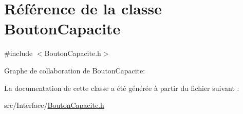 \hypertarget{class_bouton_capacite}{}\section{Référence de la classe Bouton\+Capacite}
\label{class_bouton_capacite}


{\ttfamily \#include $<$Bouton\+Capacite.\+h$>$}



Graphe de collaboration de Bouton\+Capacite\+:


La documentation de cette classe a été générée à partir du fichier suivant \+:\begin{DoxyCompactItemize}
\item 
src/\+Interface/\hyperlink{_bouton_capacite_8h}{Bouton\+Capacite.\+h}\end{DoxyCompactItemize}
